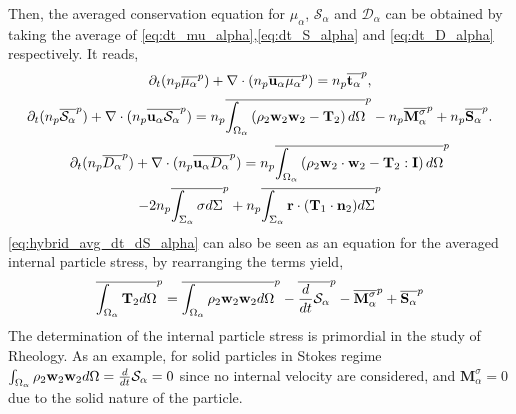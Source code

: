 Then, the averaged conservation equation for $\mu_\alpha$, $\mathcal{S}_\alpha$ and $\mathcal{D}_\alpha$ can be obtained by taking the average of \ref{eq:dt_mu_alpha},\ref{eq:dt_S_alpha} and \ref{eq:dt_D_alpha} respectively.
It reads,
\begin{equation}
    \partial_t (n_p\overline{\mu_\alpha}^{p})
    + \mathbf{\nabla}\cdot (n_p\overline{  \textbf{u}_\alpha \mu_\alpha}^{p})
    =  
    n_p\overline{\textbf{t}_\alpha}^{p},
    \label{eq:hybrid_avg_dt_dmu_alpha}
\end{equation}
\begin{multline}    
    \partial_t (n_p\overline{\mathcal{S}_\alpha}^{p})
    + \mathbf{\nabla}\cdot (n_p\overline{  \textbf{u}_\alpha \mathcal{S}_\alpha}^{p})
    =  n_p\overline{\int_{\Omega_\alpha} \left(
        \rho_2\textbf{w}_2 \textbf{w}_2
        - \mathbf{T}_2
        \right) d\Omega}^{p}
        - n_p\overline{\textbf{M}_\alpha^\sigma}^{p}
        + n_p\overline{\textbf{S}_\alpha}^{p}.
    \label{eq:hybrid_avg_dt_dS_alpha}
\end{multline}
\begin{multline}
    \partial_t (n_p\overline{D_\alpha}^{p})
    + \mathbf{\nabla}\cdot (n_p\overline{  \textbf{u}_\alpha D_\alpha}^{p})
    = n_p\overline{\int_{\Omega_\alpha} \left(
        \rho_2 \textbf{w}_2 \cdot \textbf{w}_2
        - \mathbf{T}_2 : \textbf{I}
        \right) d\Omega}^{p}\\
        - 2n_p\overline{\int_{\Sigma_\alpha} \sigma d\Sigma}^{p}
        + n_p\overline{\int_{\Sigma_\alpha} \textbf{r}\cdot(\textbf{T}_1\cdot\textbf{n}_2) d\Sigma}^{p}
    \label{eq:hybrid_avg_dt_dD_alpha}
\end{multline}
\ref{eq:hybrid_avg_dt_dS_alpha} can also be seen as an equation for the averaged internal particle stress, by rearranging the terms yield, 
\begin{equation}    
    \overline{\int_{\Omega_\alpha}\mathbf{T}_2d\Omega}^{p}
    = \overline{ \int_{\Omega_\alpha} \rho_2 \textbf{w}_2 \textbf{w}_2d\Omega}^{p}
    - \overline{ \frac{d}{d t} \mathcal{S}_\alpha}^{p}
    - \overline{ \textbf{M}_\alpha^\sigma}^{p}
    + \overline{  \textbf{S}_\alpha}^{p}
    \label{eq:T_definition}
\end{equation}
The determination of the internal particle stress is primordial in the study of Rheology.
As an example, for solid particles in Stokes regime $\int_{\Omega_\alpha} \rho_2 \textbf{w}_2 \textbf{w}_2d\Omega =  \frac{d}{d t} \mathcal{S}_\alpha = 0$ since no internal velocity are considered, and $\textbf{M}_\alpha^\sigma=0$ due to the solid nature of the particle. 
